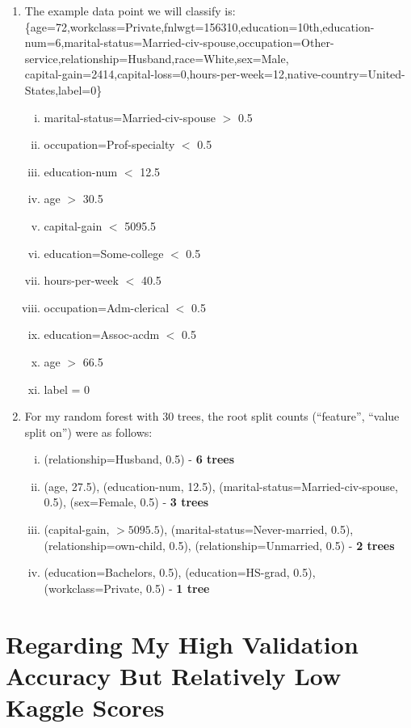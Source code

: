 \documentclass{article}
\begin{document}
\begin{enumerate}
  \item The example data point we will classify is: \{age=72,workclass=Private,fnlwgt=156310,education=10th,education-num=6,marital-status=Married-civ-spouse,occupation=Other-service,relationship=Husband,race=White,sex=Male,\\
    capital-gain=2414,capital-loss=0,hours-per-week=12,native-country=United-States,label=0\}
    \begin{enumerate}[i.]
      \item marital-status=Married-civ-spouse $>$ 0.5
      \item occupation=Prof-specialty $<$ 0.5
      \item education-num $<$ 12.5
      \item age $>$ 30.5
      \item capital-gain $<$ 5095.5
      \item education=Some-college $<$ 0.5
      \item hours-per-week $<$ 40.5
      \item occupation=Adm-clerical $<$ 0.5
      \item education=Assoc-acdm $<$ 0.5
      \item age $>$ 66.5
      \item label = 0
    \end{enumerate}


  \item For my random forest with 30 trees, the root split counts (``feature'', ``value split on'') were as follows:
    \begin{enumerate}[i.]
      \item (relationship=Husband, 0.5) - \textbf{6 trees}
      \item (age, 27.5), (education-num, 12.5), (marital-status=Married-civ-spouse, 0.5), (sex=Female, 0.5) - \textbf{3 trees}
      \item (capital-gain, $> 5095.5$), (marital-status=Never-married, 0.5), (relationship=own-child, 0.5), (relationship=Unmarried, 0.5) - \textbf{2 trees}
      \item (education=Bachelors, 0.5), (education=HS-grad, 0.5), (workclass=Private, 0.5) - \textbf{1 tree}
    \end{enumerate}
\end{enumerate}

\section*{Regarding My High Validation Accuracy But Relatively Low Kaggle Scores}
\end{document}

